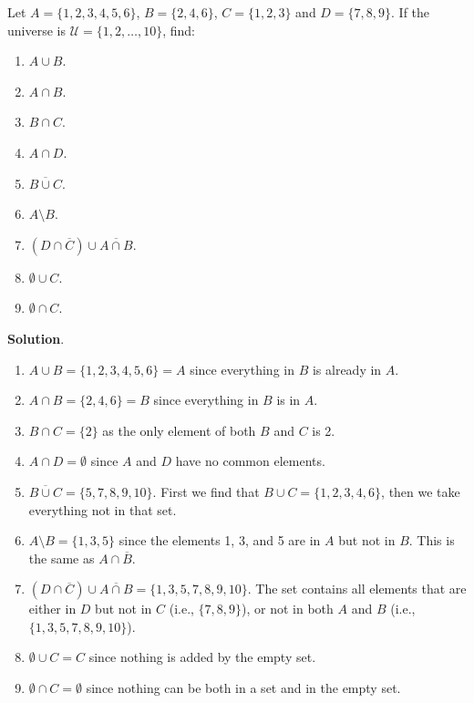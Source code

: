 \documentclass[11pt,]{book}
\theoremstyle{ptxplainnotitle}
\theoremstyle{ptxplaintitle}
\theoremstyle{ptxdefinitionnotitle}
\theoremstyle{ptxdefinitiontitle}
\theoremstyle{ptxdefinitionnotitle}
\theoremstyle{ptxdefinitiontitle}
\theoremstyle{ptxdefinitionnotitle}
\theoremstyle{ptxdefinitiontitle}
\theoremstyle{ptxdefinitiontitlenonumber}
\theoremstyle{ptxdefinitiontitlenonumber}
\numberwithin{equation}{chapter}
\newcommand{\U}{\mathcal U}
\renewcommand{\bar}{\overline}
\begin{document}
\begin{example}\label{example-32}
\hypertarget{p-786}{}%
Let \(A = \{1, 2, 3, 4, 5, 6\}\), \(B = \{2, 4, 6\}\), \(C = \{1, 2, 3\}\) and \(D = \{7, 8, 9\}\). If the universe is \(\U = \{1, 2, \ldots, 10\}\), find: \leavevmode%
\begin{enumerate}
\item\hypertarget{li-319}{}\(A \cup B\).%
\item\hypertarget{li-320}{}\(A \cap B\).%
\item\hypertarget{li-321}{}\(B \cap C\).%
\item\hypertarget{li-322}{}\(A \cap D\).%
\item\hypertarget{li-323}{}\(\bar{B \cup C}\).%
\item\hypertarget{li-324}{}\(A \setminus B\).%
\item\hypertarget{li-325}{}\((D \cap \bar C) \cup \bar{A \cap B}\).%
\item\hypertarget{li-326}{}\(\emptyset \cup C\).%
\item\hypertarget{li-327}{}\(\emptyset \cap C\).%
\end{enumerate}
%
\par\smallskip%
\noindent\textbf{Solution}.\hypertarget{solution-104}{}\quad%
\hypertarget{p-787}{}%
\leavevmode%
\begin{enumerate}
\item\hypertarget{li-328}{}\(A \cup B = \{1, 2, 3, 4, 5, 6\} = A\) since everything in \(B\) is already in \(A\).%
\item\hypertarget{li-329}{}\(A \cap B = \{2, 4, 6\} = B\) since everything in \(B\) is in \(A\).%
\item\hypertarget{li-330}{}\(B \cap C = \{2\}\) as the only element of both \(B\) and \(C\) is 2.%
\item\hypertarget{li-331}{}\(A \cap D = \emptyset\) since \(A\) and \(D\) have no common elements.%
\item\hypertarget{li-332}{}\(\bar{B \cup C} = \{5, 7, 8, 9, 10\}\). First we find that \(B \cup C = \{1, 2, 3, 4, 6\}\), then we take everything not in that set.%
\item\hypertarget{li-333}{}\(A \setminus B = \{1, 3, 5\}\) since the elements 1, 3, and 5 are in \(A\) but not in \(B\). This is the same as \(A \cap \bar B\).%
\item\hypertarget{li-334}{}\((D \cap \bar C) \cup \bar{A \cap B} = \{1, 3, 5, 7, 8, 9, 10\}.\) The set contains all elements that are either in \(D\) but not in \(C\) (i.e., \(\{7,8,9\}\)), or not in both \(A\) and \(B\) (i.e., \(\{1,3,5,7,8,9,10\}\)).%
\item\hypertarget{li-335}{}\(\emptyset \cup C = C\) since nothing is added by the empty set.%
\item\hypertarget{li-336}{}\(\emptyset \cap C = \emptyset\) since nothing can be both in a set and in the empty set.%
\end{enumerate}
%
\end{example}
\end{document}
